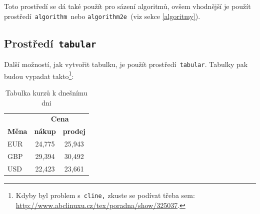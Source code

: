 \documentclass[11pt,a4paper]{article}
\begin{document}
\begin{NoHyper}
\noindent Toto prostředí se dá také použít pro sázení algoritmů, ovšem vhodnější je použít prostředí\verb= algorithm =nebo \verb=algorithm2e =(viz sekce \ref{algoritmy}). 
\end{NoHyper}

\subsection{Prostředí\texttt{ tabular}}

Další možností, jak vytvořit tabulku, je použít prostředí\verb= tabular=. Tabulky pak budou vypadat takto\footnote{Kdyby byl problem s\texttt{ cline,} zkuste se podívat třeba sem: \href{http://www.abclinuxu.cz/tex/poradna/show/325037}{http://www.abclinuxu.cz/tex/poradna/show/325037}.}:
\bigskip
\begin{table}[h]
    \centering
        \begin{tabular}{|l|c|c|}
            \hline
                      & \multicolumn{2}{c|}{\textbf{Cena}} \\ \cline{2-3}
        \textbf{Měna} & \textbf{nákup} & \textbf{prodej} \\ \hline
                EUR   & 24,775         & 25,943 \\
                GBP   & 29,394         & 30,492 \\
                USD   & 22,423         & 23,661 \\
         \hline
        \end{tabular}
        \caption{Tabulka kurzů k dnešnímu dni}
        \label{tab:tab1}
\end{table}
\bigskip
\end{document}
